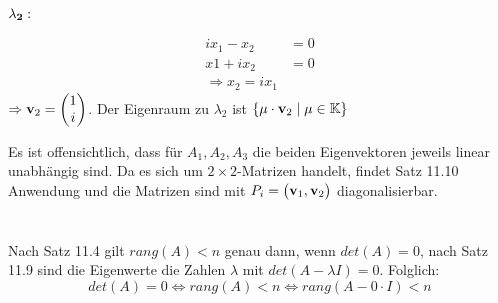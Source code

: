 \documentclass{../mfa}
\begin{document}
$\mathbf{\lambda_2:}$
\par 
\begin{align*}
   ix_1  -x_2 &= 0 \\
   x1  + ix_2 &= 0 \\
   \Rightarrow x_2 = ix_1
\end{align*}
$\Rightarrow \v{2} = \begin{pmatrix} 1 \\ i \end{pmatrix}$. Der Eigenraum zu
   $\lambda_2$ ist $\{\mu \cdot \v{2} \mid \mu \in \mathbb{K}\}$

Es ist offensichtlich, dass für $A_1, A_2, A_3$ die beiden Eigenvektoren jeweils
linear unabhängig sind. Da es sich um $2\times 2$-Matrizen handelt, findet Satz
11.10 Anwendung und die Matrizen sind mit $P_i = \begin{pmatrix}\v{1}, \v{2}
\end{pmatrix}$ diagonalisierbar.

\section{}
\section{}
\subsection{}
Nach Satz 11.4 gilt $rang(A) < n$ genau dann, wenn $det(A) = 0$, nach Satz 11.9
sind die Eigenwerte die Zahlen $\lambda$ mit $det(A - \lambda I) = 0$. Folglich:
\begin{equation*}
   det(A) = 0 \Leftrightarrow rang(A) < n \Leftrightarrow rang(A - 0\cdot I) < n
\end{equation*}
\end{document}
